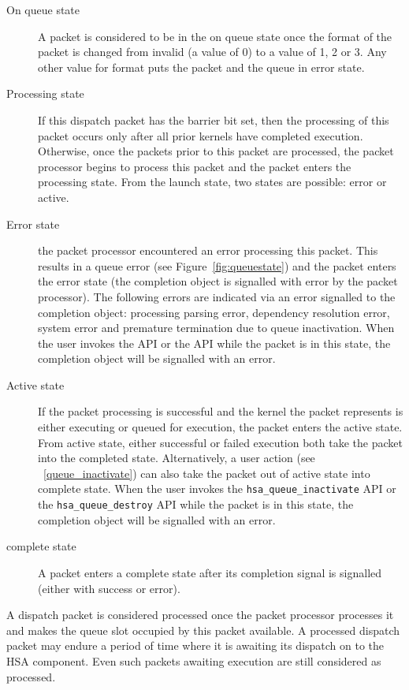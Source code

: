 \begin{description}
\item[On queue state] A packet is considered to be in the on queue
state once the format of the packet is changed from invalid (a value
of 0) to a value of 1, 2 or 3. Any other value for format puts the
packet and the queue in error state.

\item[Processing state] If this dispatch packet has the barrier bit
set, then the processing of this packet occurs only after all prior
kernels have completed execution.  Otherwise, once the packets prior
to this packet are processed, the packet processor begins to process
this packet and the packet enters the processing state.  From the
launch state, two states are possible: error or active.

\item[Error state] the packet processor encountered an error
processing this packet. This results in a queue error (see
Figure~\ref{fig:queuestate}) and the packet enters the error state
(the completion object is signalled with error by the packet
processor). The following errors are indicated via an error signalled
to the completion object: 
processing parsing error, dependency resolution error, system error
and premature termination due to queue inactivation.
When the user invokes the
 API or the
 API while the packet is in this state, the
completion object will be signalled with an error.

\item[Active state] If the packet processing is successful and the
kernel the packet represents is either executing or queued for
execution, the packet enters the active state. From active state,
either successful or failed execution both take the packet into the
completed state.  Alternatively, a user action (see
~\ref{queue_inactivate}) can also take the packet out of
active state into complete state.  When the user invokes the
\texttt{hsa\_queue\_inactivate} API or the
\texttt{hsa\_queue\_destroy} API while the packet is in this state, the
completion object will be signalled with an error. 

\item[complete state] A packet enters a complete state after its
completion signal is signalled (either with success or error).
\end{description}

A dispatch packet is considered processed once the packet processor
processes it and makes the queue slot occupied by this packet
available. A processed dispatch packet may endure a period of time
where it is awaiting its dispatch on to the HSA component. Even such
packets awaiting execution are still considered as processed. 

